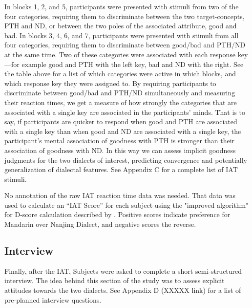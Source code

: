 In blocks 1, 2, and 5, participants were presented with stimuli from two of the four categories, requiring them to discriminate between the two target-concepts, PTH and ND, or between the two poles of the associated attribute, good and bad. In blocks 3, 4, 6, and 7, participants were presented with stimuli from all four categories, requiring them to discriminate between good/bad and PTH/ND at the same time. Two of these categories were associated with each response key---for example good and PTH with the left key, bad and ND with the right. See the table above for a list of which categories were active in which blocks, and which response key they were assigned to. By requiring participants to discriminate between good/bad and PTH/ND simultaneously and measuring their reaction times, we get a measure of how strongly the categories that are associated with a single key are associated in the participants’ minds. That is to say, if participants are quicker to respond when good and PTH are associated with a single key than when good and ND are associated with a single key, the participant’s mental association of goodness with PTH is stronger than their association of goodness with ND. In this way we can assess implicit goodness judgments for the two dialects of interest, predicting convergence and potentially generalization of dialectal features. See Appendix C for a complete list of IAT stimuli.

No annotation of the raw IAT reaction time data was needed. That data was used to calculate an “IAT Score” for each subject using the "improved algorithm" for D-score calculation described by \cite{greenwald2003understanding}. Positive scores indicate preference for Mandarin over Nanjing Dialect, and negative scores the reverse.%

\subsection{Interview}
\label{ssec:procedureInterview}
Finally, after the IAT, Subjects were asked to complete a short semi-structured interview. The idea behind this section of the study was to assess explicit attitudes towards the two dialects. See Appendix D (XXXXX link) for a list of pre-planned interview questions.

